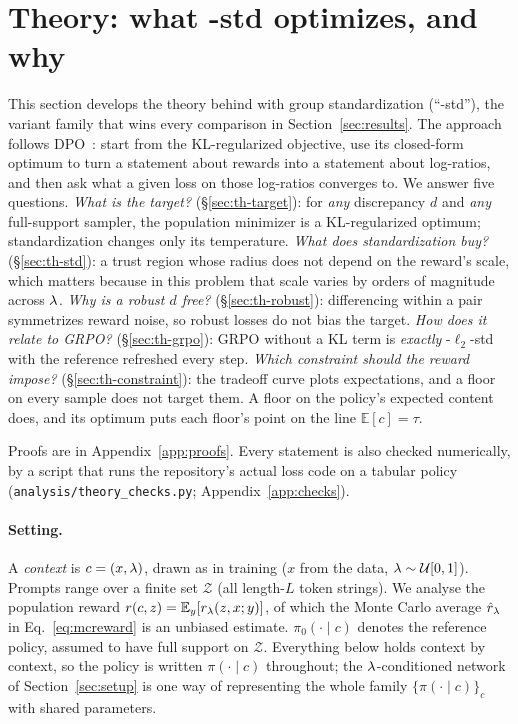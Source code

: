 \section{Theory: what \rrebel{}-std optimizes, and why}
\label{sec:theory}

This section develops the theory behind \rrebel{} with group standardization
(``-std''), the variant family that wins every comparison in
Section~\ref{sec:results}. The approach follows DPO~\citep{rafailov2023dpo}:
start from the KL-regularized objective, use its closed-form optimum to turn a
statement about rewards into a statement about log-ratios, and then ask what a
given loss on those log-ratios converges to. We answer five questions.
\emph{What is the target?} (\S\ref{sec:th-target}): for \emph{any} discrepancy
$d$ and \emph{any} full-support sampler, the population minimizer is a
KL-regularized optimum; standardization changes only its temperature.
\emph{What does standardization buy?} (\S\ref{sec:th-std}): a trust region
whose radius does not depend on the reward's scale, which matters because in
this problem that scale varies by orders of magnitude across $\lambda$.
\emph{Why is a robust $d$ free?} (\S\ref{sec:th-robust}): differencing within
a pair symmetrizes reward noise, so robust losses do not bias the target.
\emph{How does it relate to GRPO?} (\S\ref{sec:th-grpo}): GRPO without a KL
term is \emph{exactly} \rrebel{}-$\ell_2$-std with the reference refreshed every
step. \emph{Which constraint should the reward impose?}
(\S\ref{sec:th-constraint}): the tradeoff curve plots expectations, and a floor
on every sample does not target them. A floor on the policy's expected
content does, and its optimum puts each floor's point on the line
$\mathbb{E}[c] = \tau$.

Proofs are in Appendix~\ref{app:proofs}. Every statement is also checked
numerically, by a script that runs the repository's actual loss code on a
tabular policy (\texttt{analysis/\allowbreak theory\_checks.py};
Appendix~\ref{app:checks}).

\paragraph{Setting.}
A \emph{context} is $c = (x, \lambda)$, drawn as in training
($x$ from the data, $\lambda \sim \mathcal{U}[0,1]$). Prompts range over a finite
set $\mathcal{Z}$ (all length-$L$ token strings). We analyse the
population reward $r(c,z) = \mathbb{E}_{y}[r_{\lambda}(z,x;y)]$, of which the Monte
Carlo average $\hat r_\lambda$ in Eq.~\eqref{eq:mcreward} is an unbiased estimate.
$\pi_0(\cdot \mid c)$ denotes the reference policy, assumed to have full support
on $\mathcal{Z}$. Everything below holds context by context, so the policy is
written $\pi(\cdot\mid c)$ throughout; the $\lambda$-conditioned network of
Section~\ref{sec:setup} is one way of representing the whole family
$\{\pi(\cdot\mid c)\}_c$ with shared parameters.

